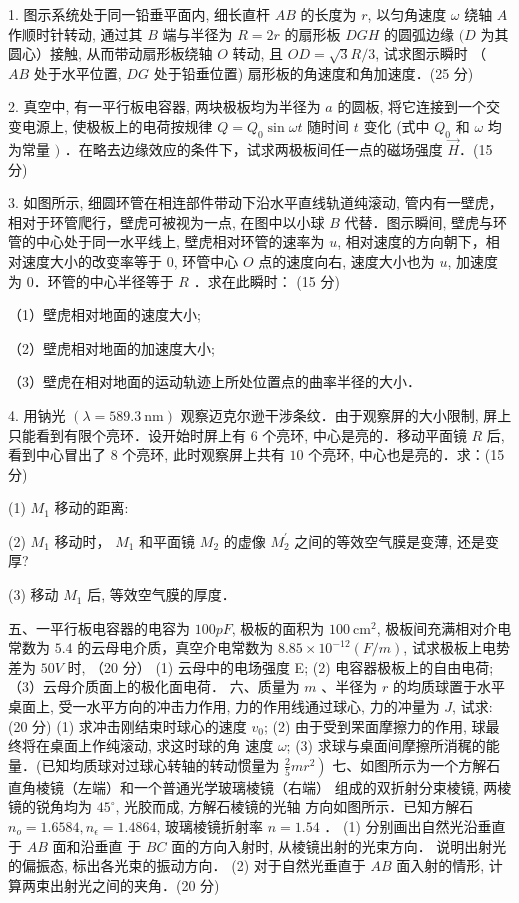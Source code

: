 
1. 图示系统处于同一铅垂平面内, 细长直杆 $A B$ 的长度为 $r$, 以匀角速度 $\omega$ 绕轴 $A$ 作顺时针转动, 通过其 $B$ 端与半径为 $R=2 r$ 的扇形板 $D G H$ 的圆弧边缘 $(D$ 为其圆心）接触, 从而带动扇形板绕轴 $O$ 转动, 且 $O D=\sqrt{3} R / 3$, 试求图示瞬时 （ $A B$ 处于水平位置, $D G$ 处于铅垂位置) 扇形板的角速度和角加速度．(25 分)

2. 真空中, 有一平行板电容器, 两块极板均为半径为 $a$ 的圆板, 将它连接到一个交变电源上, 使极板上的电荷按规律 $Q=Q_{0} \sin \omega t$ 随时间 $t$ 变化 (式中 $Q_{0}$ 和 $\omega$ 均为常量 $)$ ．在略去边缘效应的条件下，试求两极板间任一点的磁场强度 $\vec{H}$．(15 分)

3. 如图所示, 细圆环管在相连部件带动下沿水平直线轨道纯滚动, 管内有一壁虎，相对于环管爬行，壁虎可被视为一点, 在图中以小球 $B$ 代替．图示瞬间, 壁虎与环管的中心处于同一水平线上, 壁虎相对环管的速率为 $u$, 相对速度的方向朝下，相对速度大小的改变率等于 $0$, 环管中心 $O$ 点的速度向右, 速度大小也为 $u$, 加速度为 $0$．环管的中心半径等于 $R$ ．求在此瞬时：
(15 分)

（1）壁虎相对地面的速度大小;

（2）壁虎相对地面的加速度大小;

（3）壁虎在相对地面的运动轨迹上所处位置点的曲率半径的大小．

4. 用钠光 $(\lambda=589.3 \mathrm{~nm})$ 观察迈克尔逊干涉条纹．由于观察屏的大小限制, 屏上只能看到有限个亮环．设开始时屏上有 $6$ 个亮环, 中心是亮的．移动平面镜 $R$ 后, 看到中心冒出了 $8$ 个亮环, 此时观察屏上共有 $10$ 个亮环, 中心也是亮的．求：(15 分)

(1) $M_{1}$ 移动的距离:

(2) $M_{1}$ 移动时， $M_{1}$ 和平面镜 $M_{2}$ 的虚像 $M_{2}^{\prime}$ 之间的等效空气膜是变薄, 还是变厚?

(3) 移动 $M_{1}$ 后, 等效空气膜的厚度．

五、一平行板电容器的电容为 $100 p F$, 极板的面积为 $100 \mathrm{~cm}^{2}$, 极板间充满相对介电常数为 $5.4$ 的云母电介质，真空介电常数为 $8.85 \times 10^{-12}(F / m)$, 试求极板上电势差为 $50 V$ 时,
（20 分）
(1) 云母中的电场强度 E;
(2) 电容器极板上的自由电荷;
（3）云母介质面上的极化面电荷．
六、质量为 $m$ 、半径为 $r$ 的均质球置于水平桌面上, 受一水平方向的冲击力作用, 力的作用线通过球心, 力的冲量为 $J$, 试求:
(20 分)
(1) 求冲击刚结束时球心的速度 $v_{0}$;
(2) 由于受到䍒面摩擦力的作用, 球最终将在桌面上作纯滚动, 求这时球的角 速度 $\omega$;
(3) 求球与桌面间摩擦所消䅏的能量．(已知均质球对过球心转轴的转动惯量为 $\left.\frac{2}{5} m r^{2}\right)$
七、如图所示为一个方解石直角棱镜（左端）和一个普通光学玻璃棱镜（右端） 组成的双折射分束棱镜, 两棱镜的锐角均为 $45^{\circ}$, 光胶而成, 方解石棱镜的光轴 方向如图所示．已知方解石 $n_{o}=1.6584, n_{\epsilon}=1.4864$, 玻璃棱镜折射率 $n=1.54$ ．
(1) 分别画出自然光沿垂直于 $A B$ 面和沿垂直 于 $B C$ 面的方向入射时, 从棱镜出射的光束方向． 说明出射光的偏振态, 标出各光束的振动方向．
(2) 对于自然光垂直于 $A B$ 面入射的情形, 计 算两束出射光之间的夹角．(20 分)